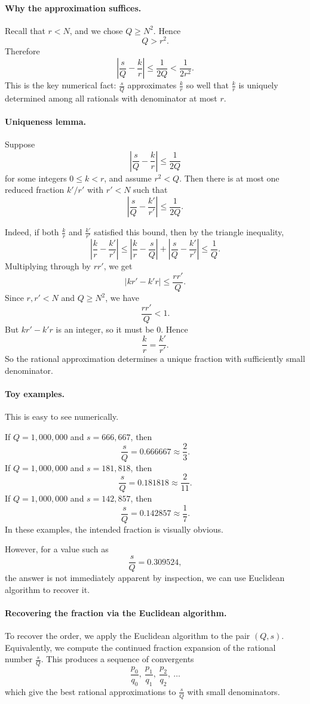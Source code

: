 \paragraph{Why the approximation suffices.} Recall that \(r < N\), and we chose \(Q\ge N^2\). Hence
\[
Q > r^2.
\]
Therefore
\[
\left|\frac{s}{Q}-\frac{k}{r}\right|
\le \frac{1}{2Q}
< \frac{1}{2r^2}.
\]
This is the key numerical fact: \(\frac{s}{Q}\) approximates \(\frac{k}{r}\) so well that \(\frac{k}{r}\) is uniquely determined among all rationals with denominator at most \(r\).

\paragraph{Uniqueness lemma.} Suppose
\[
\left|\frac{s}{Q}-\frac{k}{r}\right|\le \frac{1}{2Q}
\]
for some integers \(0\le k<r\), and assume \(r^2<Q\). Then there is at most one reduced fraction \(k'/r'\) with \(r'<N\) such that
\[
\left|\frac{s}{Q}-\frac{k'}{r'}\right|\le \frac{1}{2Q}.
\]

Indeed, if both \(\frac{k}{r}\) and \(\frac{k'}{r'}\) satisfied this bound, then by the triangle inequality,
\[
\left|\frac{k}{r}-\frac{k'}{r'}\right|
\le
\left|\frac{k}{r}-\frac{s}{Q}\right|
+
\left|\frac{s}{Q}-\frac{k'}{r'}\right|
\le \frac{1}{Q}.
\]
Multiplying through by \(rr'\), we get
\[
|kr'-k'r|
\le \frac{rr'}{Q}.
\]
Since \(r,r'<N\) and \(Q\ge N^2\), we have
\[
\frac{rr'}{Q}<1.
\]
But \(kr'-k'r\) is an integer, so it must be \(0\). Hence
\[
\frac{k}{r}=\frac{k'}{r'}.
\]
So the rational approximation determines a unique fraction with sufficiently small denominator.

\paragraph{Toy examples.} This is easy to see numerically.

If \(Q=1{,}000{,}000\) and \(s=666{,}667\), then
\[
\frac{s}{Q}=0.666667 \approx \frac{2}{3}.
\]
If \(Q=1{,}000{,}000\) and \(s=181{,}818\), then
\[
\frac{s}{Q}=0.181818 \approx \frac{2}{11}.
\]
If \(Q=1{,}000{,}000\) and \(s=142{,}857\), then
\[
\frac{s}{Q}=0.142857 \approx \frac{1}{7}.
\]
In these examples, the intended fraction is visually obvious.

However, for a value such as
\[
\frac{s}{Q}=0.309524,
\]
the answer is not immediately apparent by inspection, we can use Euclidean algorithm to recover it.

\paragraph{Recovering the fraction via the Euclidean algorithm.}
To recover the order, we apply the Euclidean algorithm to the pair \((Q,s)\). Equivalently, we compute the continued fraction expansion of the rational number \(\frac{s}{Q}\). This produces a sequence of convergents
\[
\frac{p_0}{q_0},\ \frac{p_1}{q_1},\ \frac{p_2}{q_2},\ \dots
\]
which give the best rational approximations to \(\frac{s}{Q}\) with small denominators.

